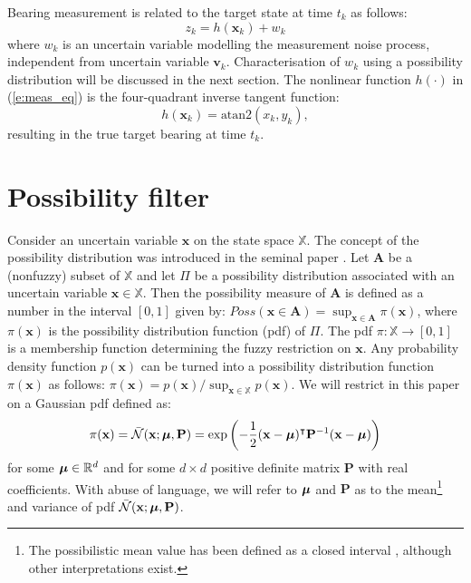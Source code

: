 \documentclass{llncs}
\newcommand{\xb}{\mathbf{x}}
\newcommand{\vb}{\mathbf{v}}
\newcommand{\Pb}{\mathbf{P}}
\newcommand{\Ab}{\mathbf{A}}
\newcommand{\muB}{\mbox{\boldmath$\mu$}}
\begin{document}
Bearing measurement is related to the target state at time $t_k$  as follows:
 \begin{equation}
 z_k = h(\xb_k)+w_k
 \label{e:meas_eq}
 \end{equation}
 where $w_k$ is an uncertain variable modelling the measurement noise process, independent \cite{houssineau_bishop_17} from uncertain variable $\vb_k$. Characterisation of $w_k$ using a possibility distribution will be discussed in the next section. The nonlinear function $h(\cdot)$ in (\ref{e:meas_eq}) is the four-quadrant inverse tangent function:
 \begin{equation}
 h(\xb_k) = \mbox{atan2}(x_k,y_k), \label{e:arctan2}
 \end{equation}
resulting in the true target bearing  at time $t_k$.



\section{Possibility filter}
\label{III}

Consider an uncertain variable $\xb$ on the state space $\mathbb{X}$.
 The concept of the possibility distribution was introduced in the seminal paper \cite{zadeh_78}. Let $\Ab$ be a (nonfuzzy) subset of $\mathbb{X}$ and let $\Pi$ be a possibility distribution associated with an uncertain variable $\xb\in\mathbb{X}$. Then the possibility measure of $\Ab$ is defined as a number in the interval $[0, 1]$ given by:
$Poss(\xb\in \Ab) = \sup_{\xb\in \Ab} \pi(\xb)$,
where $\pi(\xb)$ is the possibility distribution function (pdf) of $\Pi$.  The pdf $\pi:\mathbb{X}\rightarrow [0,1]$ is a membership function determining the fuzzy restriction on $\xb$. Any probability density function $p(\xb)$ can be turned into a possibility distribution function $\pi(\xb)$ as follows: $\pi(\xb) = p(\xb) / \sup_{\xb\in \mathbb{X}} p(\xb)$. We will restrict in this paper on a Gaussian pdf defined as:
\begin{equation}
\pi(\xb) = \bar{\mathcal{N}}(\xb;\muB,\Pb) = \exp\left(-\frac{1}{2}(\xb-\muB)^\intercal\Pb^{-1}(\xb-\muB)\right)
\label{e:Gauss}
\end{equation}
for some $\muB\in\mathbb{R}^d$ and for some $d\times d$ positive definite matrix $\Pb$ with real coefficients. With abuse of language, we will refer to $\muB$ and $\Pb$ as to the mean\footnote{The possibilistic mean value has been defined as a closed interval \cite{dubois1987mean}, although other interpretations exist.}
 and variance of pdf $ \bar{\mathcal{N}}(\xb;\muB,\Pb)$.
\end{document}
